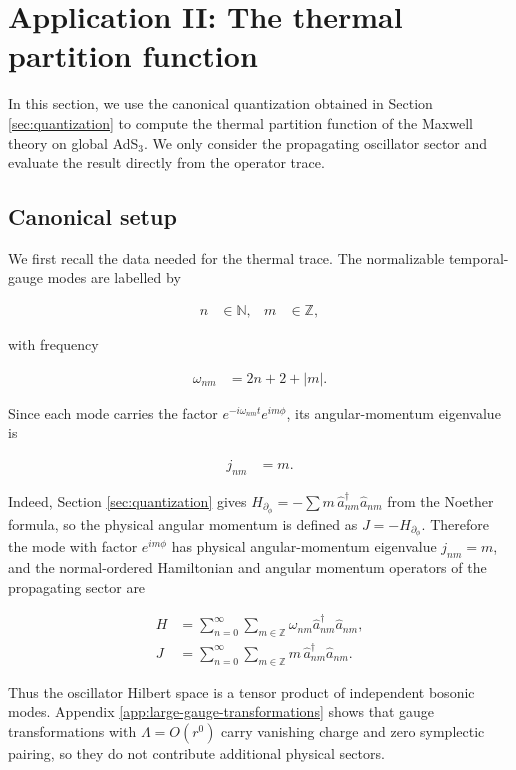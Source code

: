 \section{Application II: The thermal partition function}\label{sec:thermal-partition-function}

In this section, we use the canonical quantization obtained in Section \ref{sec:quantization} to compute the thermal partition function of the Maxwell theory on global AdS$_3$. We only consider the propagating oscillator sector and evaluate the result directly from the operator trace.

\subsection{Canonical setup}\label{subsec:canonical-setup}

We first recall the data needed for the thermal trace. The normalizable temporal-gauge modes are labelled by

\begin{align}
n & \in \mathbb{N}, & m & \in \mathbb{Z},
\end{align}

with frequency

\begin{align}
\omega_{nm} & =2n+2+|m|.
\end{align}

Since each mode carries the factor $e^{-i\omega_{nm}t}e^{im\phi}$, its angular-momentum eigenvalue is

\begin{align}
j_{nm} & =m.
\end{align}

Indeed, Section \ref{sec:quantization} gives $H_{\partial_{\phi}}=-\sum m\,\hat{a}_{nm}^{\dagger}\hat{a}_{nm}$ from the Noether formula, so the physical angular momentum is defined as $J=-H_{\partial_{\phi}}$. Therefore the mode with factor $e^{im\phi}$ has physical angular-momentum eigenvalue $j_{nm}=m$, and the normal-ordered Hamiltonian and angular momentum operators of the propagating sector are

\begin{align}
H & =\sum _{n=0}^{\infty}\sum _{m\in \mathbb{Z}}\omega _{nm}\hat{a}^{\dagger}_{nm}\hat{a}_{nm}, \\
J & =\sum _{n=0}^{\infty}\sum _{m\in \mathbb{Z}}m\,\hat{a}^{\dagger}_{nm}\hat{a}_{nm}.
\end{align}

Thus the oscillator Hilbert space is a tensor product of independent bosonic modes. Appendix \ref{app:large-gauge-transformations} shows that gauge transformations with $\Lambda=O(r^{0})$ carry vanishing charge and zero symplectic pairing, so they do not contribute additional physical sectors.

